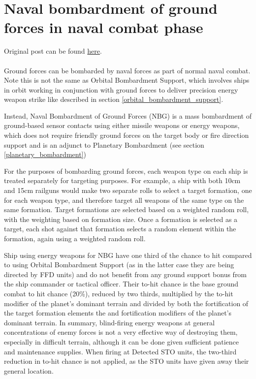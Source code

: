 \documentclass[../../Aurora C# unofficial manual.tex]{subfiles}
\begin{document}
	\section{Naval bombardment of ground forces in naval combat phase}
	Original post can be found
	\href{http://aurora2.pentarch.org/index.php?topic=8495.msg111435#msg111435}{here}.
	\\\\
	
	Ground forces can be bombarded by naval forces as part of normal naval combat. Note this is not the same as Orbital Bombardment Support, which involves ships in orbit working in conjunction with ground forces to deliver precision energy weapon strike like described in section \ref{orbital_bombardment_support}.
	
	Instead, Naval Bombardment of Ground Forces (NBG) is a mass bombardment of ground-based sensor contacts using either missile weapons or energy weapons, which does not require friendly ground forces on the target body or fire direction support and is an adjunct to Planetary Bombardment (see section \ref{planetary_bombardment})
	
	For the purposes of bombarding ground forces, each weapon type on each ship is treated separately for targeting purposes. For example, a ship with both 10cm and 15cm railguns would make two separate rolls to select a target formation, one for each weapon type, and therefore target all weapons of the same type on the same formation. Target formations are selected based on a weighted random roll, with the weighting based on formation size. Once a formation is selected as a target, each shot against that formation selects a random element within the formation, again using a weighted random roll.
	
	Ship using energy weapons for NBG have one third of the chance to hit compared to using Orbital Bombardment Support (as in the latter case they are being directed by FFD units) and do not benefit from any ground support bonus from the ship commander or tactical officer. Their to-hit chance is the base ground combat to hit chance (20\%), reduced by two thirds, multiplied by the to-hit modifier of the planet's dominant terrain and divided by both the fortification of the target formation elements the and fortification modifiers of the planet's dominant terrain. In summary, blind-firing energy weapons at general concentrations of enemy forces is not a very effective way of destroying them, especially in difficult terrain, although it can be done given sufficient patience and maintenance supplies. When firing at Detected STO units, the two-third reduction in to-hit chance is not applied, as the STO units have given away their general location.
	
\end{document}

